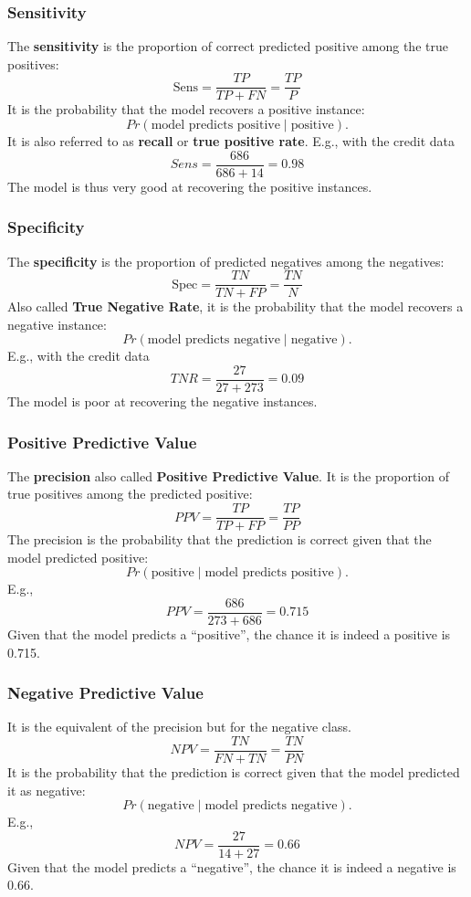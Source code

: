\begin{frame}
\frametitle{Sensitivity}
The {\bf sensitivity} is the proportion of correct predicted positive among the true positives:
$$
\mbox{Sens}=\frac{TP}{TP+FN}=\frac{TP}{P}
$$
It is the probability that the model recovers a positive instance:
$$
Pr\left(\mbox{model predicts positive}\;\vert\;\mbox{positive}\right).
$$
It is also referred to as {\bf recall} or {\bf true positive rate}. E.g., with the credit data
$$
Sens=\frac{686}{686+14}=0.98
$$
The model is thus very good at recovering the positive instances.
\end{frame}
\begin{frame}
\frametitle{Specificity}
The {\bf specificity} is the proportion of predicted negatives among the negatives:
$$
\mbox{Spec}=\frac{TN}{TN+FP}=\frac{TN}{N}
$$
Also called {\bf True Negative Rate}, it is the probability that the model recovers a negative instance:
$$
Pr\left(\mbox{model predicts negative}\;\vert\;\mbox{negative}\right).
$$
E.g., with the credit data
$$
TNR=\frac{27}{27+273}=0.09
$$
The model is poor at recovering the negative instances.
\end{frame}
\begin{frame}
\frametitle{Positive Predictive Value}
The {\bf precision} also called {\bf Positive Predictive Value}. It is the proportion of true positives among the predicted positive:
$$
PPV=\frac{TP}{TP+FP}=\frac{TP}{PP}
$$
The precision is the probability that the prediction is correct given that the model predicted positive:
$$
Pr\left(\mbox{positive}\;\vert\;\mbox{model predicts positive}\right).
$$
E.g., 
$$
PPV = \frac{686}{273+686} = 0.715
$$
Given that the model predicts a ``positive'', the chance it is indeed a positive is 0.715.  
\end{frame}
\begin{frame}
\frametitle{Negative Predictive Value}
It is the equivalent of the precision but for the negative class.
$$
NPV=\frac{TN}{FN+TN}=\frac{TN}{PN}
$$
It is the probability that the prediction is correct given that the model predicted it as negative:
$$
Pr\left(\mbox{negative}\;\vert\;\mbox{model predicts negative}\right).
$$
E.g., 
$$
NPV = \frac{27}{14+27} = 0.66
$$
Given that the model predicts a ``negative'', the chance it is indeed a negative is 0.66.
\end{frame}
